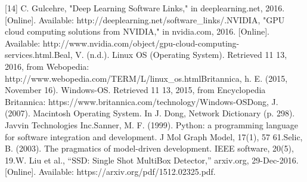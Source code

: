 [14] C. Gulcehre, "Deep Learning Software Links," in deeplearning.net, 2016. [Online]. Available: http://deeplearning.net/software_links/.\newline
[15] NVIDIA, "GPU cloud computing solutions from NVIDIA," in nvidia.com, 2016. [Online]. Available: http://www.nvidia.com/object/gpu-cloud-computing-services.html.\newline
[16] Beal, V. (n.d.). Linux OS (Operating System). Retrieved 11 13, 2016, from Webopedia: http://www.webopedia.com/TERM/L/linux_os.html\newline
[17] Britannica, h. E. (2015, November 16). Windows-OS. Retrieved 11 13, 2015, from Encyclopedia Britannica: https://www.britannica.com/technology/Windows-OS\newline
[18] Dong, J. (2007). Macintosh Operating System. In J. Dong, Network Dictionary (p. 298). Javvin Technologies Inc.\newline
[19] Sanner, M. F. (1999). Python: a programming language for software integration and	development. J Mol Graph Model, 17(1), 57 61.\newline
[20] Selic, B. (2003). The pragmatics of model-driven development. IEEE software, 20(5), 19.\newline
[21] W. Liu et al., “SSD: Single Shot MultiBox Detector,” arxiv.org, 29-Dec-2016. [Online]. Available: https://arxiv.org/pdf/1512.02325.pdf.





